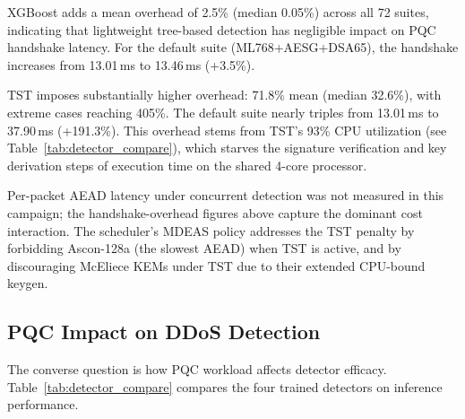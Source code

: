 XGBoost adds a mean overhead of 2.5\% (median 0.05\%) across
all 72 suites, indicating that lightweight tree-based detection has
negligible impact on PQC handshake latency.  For the default suite
(ML768+AESG+DSA65), the handshake increases from 13.01\,ms to
13.46\,ms (+3.5\%).

TST imposes substantially higher overhead: 71.8\% mean (median
32.6\%), with extreme cases reaching 405\%.  The default suite nearly
triples from 13.01\,ms to 37.90\,ms (+191.3\%).  This overhead stems
from TST's 93\% CPU utilization (see Table~\ref{tab:detector_compare}),
which starves the signature verification and key derivation steps of
execution time on the shared 4-core processor.

Per-packet AEAD latency under concurrent detection was not measured
in this campaign; the handshake-overhead figures above capture the
dominant cost interaction.  The scheduler's MDEAS policy addresses
the TST penalty by forbidding Ascon-128a (the slowest AEAD) when
TST is active, and by discouraging McEliece KEMs under TST due to
their extended CPU-bound keygen.

\subsection{PQC Impact on DDoS Detection}
\label{sec:pqc_on_ddos}

The converse question is how PQC workload affects detector efficacy.
Table~\ref{tab:detector_compare} compares the four trained detectors
on inference performance.

